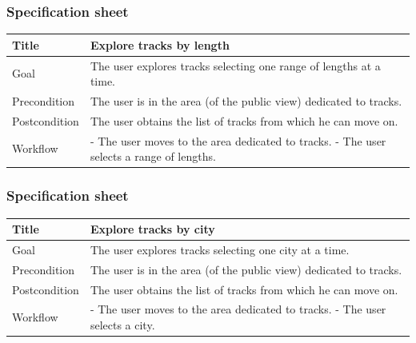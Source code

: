 \documentclass{beamer}
\begin{document}
\begin{frame}
    \frametitle{Specification sheet}
    \begin{table}
        \tiny
        \begin{tabular}{|p{2cm}|p{6cm}|}
        \hline
        Title & \textbf{Explore tracks by length} \\
        \hline
        Goal & The user explores tracks selecting one range of lengths at a time. \\
        \hline
        Precondition & The user is in the area (of the public view) dedicated to tracks.\\
        \hline
        Postcondition & The user obtains the list of tracks from which he can move on.\\
        \hline
        Workflow &
        - The user moves to the area dedicated to tracks. \newline
        - The user selects a range of lengths. \\
        \hline
        \end{tabular}
\end{table}
\end{frame}

\begin{frame}
    \frametitle{Specification sheet}
    \begin{table}
        \tiny
        \begin{tabular}{|p{2cm}|p{6cm}|}
        \hline
        Title & \textbf{Explore tracks by city} \\
        \hline
        Goal & The user explores tracks selecting one city at a time. \\
        \hline
        Precondition & The user is in the area (of the public view) dedicated to tracks.\\
        \hline
        Postcondition & The user obtains the list of tracks from which he can move on.\\
        \hline
        Workflow &
        - The user moves to the area dedicated to tracks. \newline
        - The user selects a city. \\
        \hline
        \end{tabular}
\end{table}
\end{frame}
\end{document}
